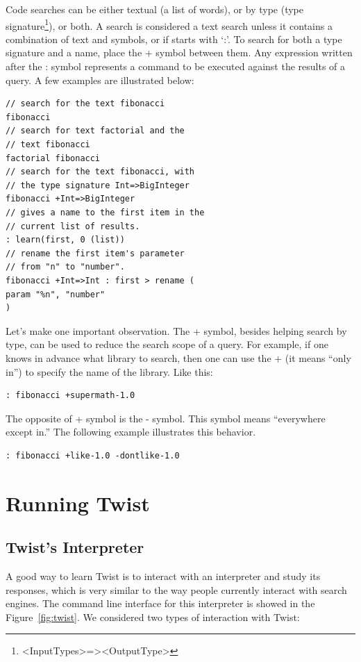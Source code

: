 Code searches can be either textual (a list of words), or by type (type signature\footnote{<InputTypes>=><OutputType>}), or both. A search is considered a text search unless it contains a combination of text and symbols, or if starts with `:'. To search for both a type signature and a name, place the + symbol between them. Any expression written after the : symbol represents a command to be executed against the results of a query. A few examples are illustrated below:

\begin{verbatim}
// search for the text fibonacci	
fibonacci
// search for text factorial and the 
// text fibonacci
factorial fibonacci
// search for the text fibonacci, with 
// the type signature Int=>BigInteger 
fibonacci +Int=>BigInteger 
// gives a name to the first item in the 
// current list of results.
: learn(first, 0 (list))
// rename the first item's parameter 
// from "n" to "number".
fibonacci +Int=>Int : first > rename (
param "%n", "number"
) 
\end{verbatim}
	 
Let's make one important observation. The + symbol, besides helping search by type, can be used to reduce the search scope of a query. For example, if one knows in advance what library to search, then one can use the + (it means ``only in'') to specify the name of the library. Like this:

\begin{verbatim}
: fibonacci +supermath-1.0 
\end{verbatim}

The opposite of + symbol is the - symbol. This symbol means ``everywhere except in.'' The following example illustrates this behavior.

\begin{verbatim}
: fibonacci +like-1.0 -dontlike-1.0
\end{verbatim}

\section{Running Twist}
\label{sec:running}

\subsection{Twist's Interpreter}
\label{sec:interpreter}

A good way to learn Twist is to interact with an interpreter and study its responses, which is very similar to the way people currently interact with search engines. The command line interface for this interpreter is showed in the Figure~\ref{fig:twist}. We considered two types of interaction with Twist: 

